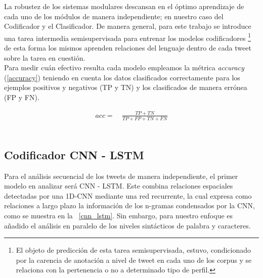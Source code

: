 	 La robustez de los sistemas modulares descansan en el óptimo aprendizaje de cada uno de los módulos de manera independiente; en nuestro caso del Codificador y el Clasificador. De manera general, para este trabajo se introduce una tarea intermedia semisupervisada para entrenar los modelos codificadores \footnote{El objeto de predicción de esta tarea semisupervisada, estuvo, condicionado por la carencia de anotación a nivel de tweet en cada uno de los corpus y se relaciona con la pertenencia o no a determinado tipo de perfil.} de esta forma los mismos aprenden relaciones del lenguaje dentro de cada tweet sobre la tarea en cuestión.\\
	 Para medir cuán efectivo resulta cada modelo empleamos la métrica \textit{accuracy} (\ref{accuracy}) teniendo en cuenta los datos clasificados correctamente para los ejemplos positivos y negativos (TP y TN) y los clasificados de manera errónea (FP y FN).
	 
	 \begin{align}
	 	acc=~& \frac{TP + TN}{TP + FP + TN + FN}\label{accuracy}
	 \end{align}\\%
 
 	\subsection{Codificador CNN - LSTM}
 	
 	Para el análisis secuencial de los tweets de manera independiente, el primer modelo en analizar será CNN - LSTM. Este combina relaciones espaciales detectadas por una 1D-CNN mediante una red recurrente, la cual expresa como relaciones a largo plazo la información de los n-gramas condensados por la CNN, como se muestra en la \figurename~\ref{cnn_lstm}.   Sin embargo, para nuestro enfoque es añadido el análisis en paralelo de los niveles sintácticos de palabra y caracteres.  	\\
 	

